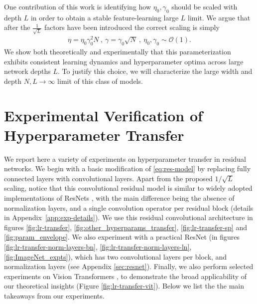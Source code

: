 \documentclass{article} %
\begin{document}
One contribution of this work is identifying how $\eta_0, \gamma_0$ should be scaled with depth $L$ in order to obtain a stable feature-learning large $L$ limit. We argue that after the $\frac{1}{\sqrt L}$ factors have been introduced the correct scaling is simply 
\begin{align}
   \eta = \eta_0 \gamma_0^2 N \ , \ \gamma = \gamma_0 \sqrt{N} \ , \  \eta_0 , \gamma_0 \sim \mathcal{O}(1) .
\end{align}
We show both theoretically and experimentally that this parameterization exhibits consistent learning dynamics and hyperparameter optima across large network depths $L$. To justify this choice, we will characterize the large width and depth $N,L \to \infty$ limit of this class of models. 

\section{Experimental Verification of Hyperparameter Transfer} \label{sec:empirical}

We report here a variety of experiments on hyperparameter transfer in residual networks. 
% 
We begin with a basic modification of \eqref{eq:res-model} by replacing fully connected layers with convolutional layers.
% 
Apart from the proposed $1/\sqrt{L}$ scaling, notice that this convolutional residual model is similar to widely adopted implementations of ResNets \citep{he2016deep}, with the main difference being the absence of normalization layers, and a single convolution operator per residual block (details in Appendix~\ref{app:exp-details}). We use this residual convolutional architecture in figures \ref{fig:lr-transfer}, \ref{fig:other_hyperparams_transfer}, \ref{fig:lr-transfer-sp} and \ref{fig:param_envelope}. 
% 
We also experiment with a practical ResNet (in figures \ref{fig:lr-transfer-norm-layers-bn}, \ref{fig:lr-transfer-norm-layers-ln}, \ref{fig:ImageNet_expts}), which has two convolutional layers per block, and normalization layers (see Appendix \ref{sec:resnet}). 
% 
Finally, we also perform selected experiments on Vision Transformers \citep{dosovitskiy2020image}, to demonstrate the broad applicability of our theoretical insights (Figure \ref{fig:lr-transfer-vit}). 
% 
Below we list the the main takeaways from our experiments. 
\end{document}
